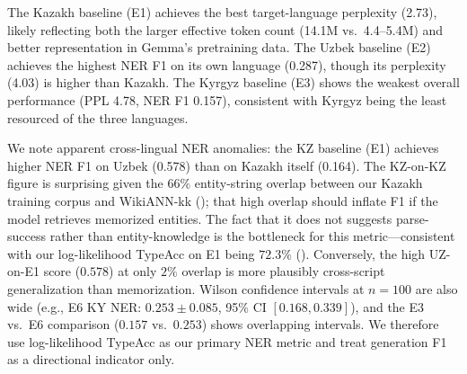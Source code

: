 \documentclass[11pt]{article}
\begin{document}
\begin{table}[t]
\caption{Main evaluation results across all experiments. \textbf{NER TypeAcc (KY)} is our primary NER metric---log-likelihood span typing on gold WikiANN-ky boundaries (); it is parse-failure immune and has lower seed-variance than generation F1. \textbf{NER F1 (gen)} is the generation-based score with $\pm 0.085$ Wilson 95\% CI at $n{=}100$, retained for comparability with prior work. We report cross-lingual NER and KZ TUMLU in the appendix (). \textbf{E5 vs.\ E5b/E5c disentangles the rank--LR--epoch confound:} catastrophic NER parse failure at high LR (E5, F1$=0$, TUMLU near random) vanishes at baseline LR (E5b/E5c) and at matched epochs (E5c) outperforms the $r{=}16$ baseline. \textbf{C5 (the $\alpha{=}32$ control at $r{=}64$, added to close the $\alpha/r$ confound L3) clarifies that E5c's target-PPL advantage came from the implicit LR boost of $\alpha/r=2$ ($\alpha{=}128$ at $r{=}64$): at matched effective LR ($\alpha{=}32$ at both ranks), the $r{=}64$ adapter is functionally indistinguishable from the $r{=}16$ baseline (KY PPL $4.46$ vs.\ $4.78$; KZ PPL $49.22$ vs.\ $47.58$; cf.\ E5c $93.5$).} $^*$EN PPL on Kazakh; $^\dagger$EN TUMLU on Kyrgyz. $^\ddagger$E5's high TypeAcc despite F1$=0$ shows entity knowledge survives the collapse---it is structured-output generation that fails ().}
\label{tab:main_results}
\end{table}

The Kazakh baseline (E1) achieves the best target-language perplexity (2.73), likely reflecting both the larger effective token count (14.1M vs.\ 4.4--5.4M) and better representation in Gemma's pretraining data. The Uzbek baseline (E2) achieves the highest NER F1 on its own language (0.287), though its perplexity (4.03) is higher than Kazakh. The Kyrgyz baseline (E3) shows the weakest overall performance (PPL 4.78, NER F1 0.157), consistent with Kyrgyz being the least resourced of the three languages.

We note apparent cross-lingual NER anomalies: the KZ baseline (E1) achieves higher NER F1 on Uzbek (0.578) than on Kazakh itself (0.164). The KZ-on-KZ figure is surprising given the $66\%$ entity-string overlap between our Kazakh training corpus and WikiANN-kk (); that high overlap should inflate F1 if the model retrieves memorized entities. The fact that it does not suggests parse-success rather than entity-knowledge is the bottleneck for this metric---consistent with our log-likelihood TypeAcc on E1 being $72.3\%$ (). Conversely, the high UZ-on-E1 score ($0.578$) at only $2\%$ overlap is more plausibly cross-script generalization than memorization. Wilson confidence intervals at $n{=}100$ are also wide (e.g., E6 KY NER: $0.253 \pm 0.085$, 95\% CI $[0.168, 0.339]$), and the E3 vs.\ E6 comparison ($0.157$ vs.\ $0.253$) shows overlapping intervals. We therefore use log-likelihood TypeAcc as our primary NER metric and treat generation F1 as a directional indicator only.
\end{document}
